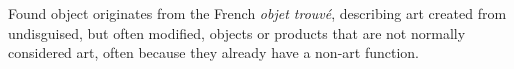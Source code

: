





%
%
Found object originates from the French \textit{objet trouvé}, describing art created from undisguised, but often modified, objects or products that are not normally considered art, often because they already have a non-art function.


